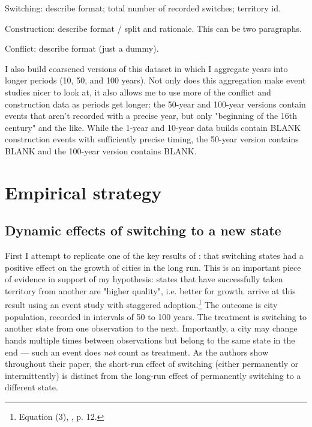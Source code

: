 \documentclass[11pt, a4paper]{article}
\begin{document}
Switching: describe format; total number of recorded switches; territory id.

Construction: describe format / split and rationale. This can be two paragraphs.

Conflict: describe format (just a dummy).


I also build coarsened versions of this dataset in which I aggregate years into longer periods (10, 50, and 100 years). Not only does this aggregation make event studies nicer to look at, it also allows me to use more of the conflict and construction data as periods get longer: the 50-year and 100-year versions contain events that aren't recorded with a precise year, but only "beginning of the 16th century" and the like. While the 1-year and 10-year data builds contain BLANK construction events with sufficiently precise timing, the 50-year version contains BLANK and the 100-year version contains BLANK.



\section{Empirical strategy}

\subsection{Dynamic effects of switching to a new state}

First I attempt to replicate one of the key results of \cite{schoenholzer2022}: that switching states had a positive effect on the growth of cities in the long run. This is an important piece of evidence in support of my hypothesis: states that have successfully taken territory from another are "higher quality", i.e. better for growth. \cite{schoenholzer2022} arrive at this result using an event study with staggered adoption.\footnote
{
    Equation (3), \citealp{schoenholzer2022}, p. 12.
}
The outcome is city population, recorded in intervals of 50 to 100 years. The treatment is switching to another state from one observation to the next. Importantly, a city may change hands multiple times between observations but belong to the same state in the end --- such an event does \textit{not} count as treatment. As the authors show throughout their paper, the short-run effect of switching (either permanently or intermittently) is distinct from the long-run effect of permanently switching to a different state.
\end{document}
